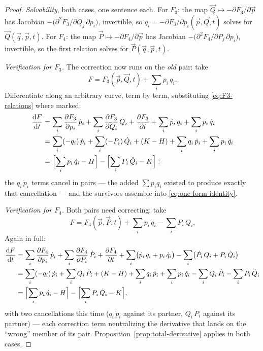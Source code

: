 \documentclass[11pt]{article}
\theoremstyle{plain}
\theoremstyle{definition}
\theoremstyle{remark}
\newcommand{\dd}{\mathrm{d}}
\newcommand{\pd}[2]{\frac{\partial #1}{\partial #2}}
\newcommand{\tot}[2]{\frac{\dd #1}{\dd #2}}
\newcommand{\vq}{\vec{q}}
\newcommand{\vp}{\vec{p}}
\newcommand{\vQ}{\vec{Q}}
\newcommand{\vP}{\vec{P}}
\begin{document}
\begin{proof}
\emph{Solvability}, both cases, one sentence each. For $F_3$: the map
$\vQ \mapsto -\partial F_3/\partial\vp$ has Jacobian
$-\bigl(\partial^2 F_3/\partial Q_j\,\partial p_i\bigr)$, invertible,
so $q_i = -\partial F_3/\partial p_i(\vp, \vQ, t)$ solves for
$\vQ(\vq, \vp, t)$. For $F_4$: the map
$\vP \mapsto -\partial F_4/\partial\vp$ has Jacobian
$-\bigl(\partial^2 F_4/\partial P_j\,\partial p_i\bigr)$, invertible,
so the first relation solves for $\vP(\vq, \vp, t)$.

\emph{Verification for $F_3$.} The correction now runs on the
\emph{old} pair: take
\begin{equation}
  F = F_3(\vp, \vQ, t) + \sum_i p_i\,q_i .
\end{equation}
Differentiate along an arbitrary curve, term by term, substituting
\eqref{eq:F3-relations} where marked:
\begin{align}
  \tot{F}{t}
  &= \sum_i \pd{F_3}{p_i}\,\dot p_i
   + \sum_i \pd{F_3}{Q_i}\,\dot Q_i
   + \pd{F_3}{t}
   + \sum_i \dot p_i\, q_i
   + \sum_i p_i\,\dot q_i \nonumber\\
  &= \sum_i (-q_i)\,\dot p_i
   + \sum_i (-P_i)\,\dot Q_i
   + (K - H)
   + \sum_i q_i\,\dot p_i
   + \sum_i p_i\,\dot q_i \nonumber\\
  &= \Bigl[\sum_i p_i\,\dot q_i - H\Bigr]
   - \Bigl[\sum_i P_i\,\dot Q_i - K\Bigr] :
\end{align}
the $q_i\,\dot p_i$ terms cancel in pairs --- the added
$\sum p_i q_i$ existed to produce exactly that cancellation --- and
the survivors assemble into \eqref{eq:one-form-identity}.

\emph{Verification for $F_4$.} Both pairs need correcting: take
\begin{equation}
  F = F_4(\vp, \vP, t) + \sum_i p_i\,q_i - \sum_i P_i\,Q_i .
\end{equation}
Again in full:
\begin{align}
  \tot{F}{t}
  &= \sum_i \pd{F_4}{p_i}\,\dot p_i
   + \sum_i \pd{F_4}{P_i}\,\dot P_i
   + \pd{F_4}{t}
   + \sum_i \bigl(\dot p_i\,q_i + p_i\,\dot q_i\bigr)
   - \sum_i \bigl(\dot P_i\,Q_i + P_i\,\dot Q_i\bigr) \nonumber\\
  &= \sum_i (-q_i)\,\dot p_i
   + \sum_i Q_i\,\dot P_i
   + (K - H)
   + \sum_i q_i\,\dot p_i + \sum_i p_i\,\dot q_i
   - \sum_i Q_i\,\dot P_i - \sum_i P_i\,\dot Q_i \nonumber\\
  &= \Bigl[\sum_i p_i\,\dot q_i - H\Bigr]
   - \Bigl[\sum_i P_i\,\dot Q_i - K\Bigr] ,
\end{align}
with two cancellations this time ($q_i\,\dot p_i$ against its partner,
$Q_i\,\dot P_i$ against its partner) --- each correction term
neutralizing the derivative that lands on the ``wrong'' member of its
pair. Proposition~\ref{prop:total-derivative} applies in both cases.
\end{proof}
\end{document}
